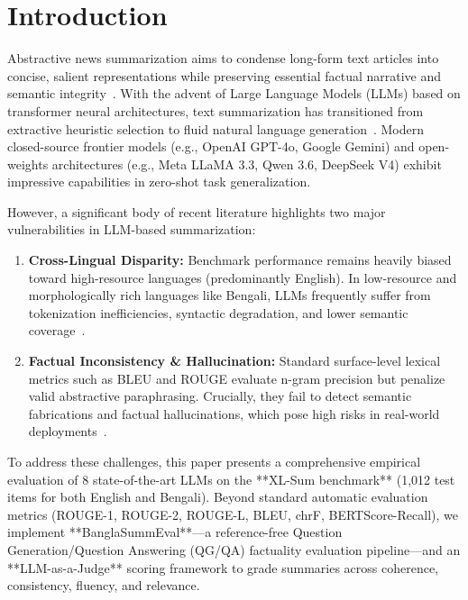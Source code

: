 \documentclass[runningheads]{llncs}
\begin{document}
%
%
\section{Introduction}\label{sec:intro}

Abstractive news summarization aims to condense long-form text articles into concise, salient representations while preserving essential factual narrative and semantic integrity~\cite{lin2004}. With the advent of Large Language Models (LLMs) based on transformer neural architectures, text summarization has transitioned from extractive heuristic selection to fluid natural language generation~\cite{zhang2019,zheng2023}. Modern closed-source frontier models (e.g., OpenAI GPT-4o, Google Gemini) and open-weights architectures (e.g., Meta LLaMA 3.3, Qwen 3.6, DeepSeek V4) exhibit impressive capabilities in zero-shot task generalization.

However, a significant body of recent literature highlights two major vulnerabilities in LLM-based summarization:
\begin{enumerate}
    \item \textbf{Cross-Lingual Disparity:} Benchmark performance remains heavily biased toward high-resource languages (predominantly English). In low-resource and morphologically rich languages like Bengali, LLMs frequently suffer from tokenization inefficiencies, syntactic degradation, and lower semantic coverage~\cite{vanveen2024}.
    \item \textbf{Factual Inconsistency \& Hallucination:} Standard surface-level lexical metrics such as BLEU and ROUGE evaluate n-gram precision but penalize valid abstractive paraphrasing. Crucially, they fail to detect semantic fabrications and factual hallucinations, which pose high risks in real-world deployments~\cite{farquhar2024,tang2023}.
\end{enumerate}

To address these challenges, this paper presents a comprehensive empirical evaluation of 8 state-of-the-art LLMs on the **XL-Sum benchmark** (1,012 test items for both English and Bengali). Beyond standard automatic evaluation metrics (ROUGE-1, ROUGE-2, ROUGE-L, BLEU, chrF, BERTScore-Recall), we implement **BanglaSummEval**—a reference-free Question Generation/Question Answering (QG/QA) factuality evaluation pipeline—and an **LLM-as-a-Judge** scoring framework to grade summaries across coherence, consistency, fluency, and relevance.
\end{document}
